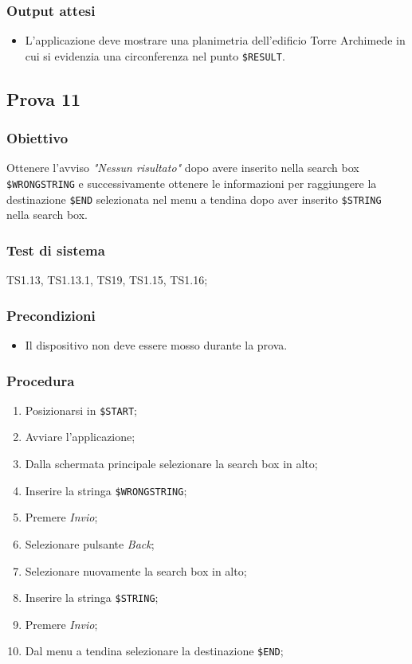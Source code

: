 \documentclass[../SperimentazioniPratiche.tex]{subfiles}
\begin{document}
	\subsubsection{Output attesi}
		\begin{itemize}
			\item L'applicazione deve mostrare una planimetria dell'edificio Torre Archimede in cui si evidenzia una circonferenza nel punto \verb|$RESULT|.
		\end{itemize}



\newpage	
\subsection{Prova 11} %
\label{subsec:Prova11}
	
	\subsubsection{Obiettivo}
		Ottenere l'avviso \textit{"Nessun risultato"} dopo avere inserito nella search box  \verb|$WRONGSTRING| e successivamente ottenere le informazioni per raggiungere la destinazione  \verb|$END| selezionata nel menu a tendina dopo aver inserito  \verb|$STRING| nella search box.
		
	\subsubsection{Test di sistema}
		TS1.13, TS1.13.1,
		TS19,
		TS1.15, TS1.16;
		
	\subsubsection{Precondizioni}
		\begin{itemize}
			\item Il dispositivo non deve essere mosso durante la prova.
		\end{itemize}
		
	\subsubsection{Procedura}
		\begin{enumerate}
		\item Posizionarsi in \verb|$START|;
		\item Avviare l'applicazione;
		\item Dalla schermata principale selezionare la search box in alto;
		\item Inserire la stringa  \verb|$WRONGSTRING|;
		\item Premere \textit{Invio};
		\item Selezionare pulsante \textit{Back};
		\item Selezionare nuovamente la search box in alto;
		\item Inserire la stringa  \verb|$STRING|;
		\item Premere \textit{Invio}; %
		\item Dal menu a tendina selezionare la destinazione  \verb|$END|;
		\end{enumerate}
		
\end{document}
